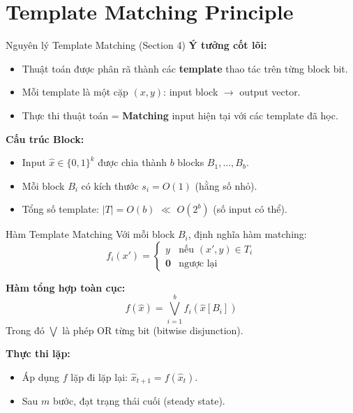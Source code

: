 \section{Template Matching Principle}

\begin{frame}{Nguyên lý Template Matching (Section 4)}
  \textbf{Ý tưởng cốt lõi:}
  \begin{itemize}
    \item Thuật toán được phân rã thành các \textbf{template} thao tác trên từng block bit.
    \item Mỗi template là một cặp $(x, y)$: input block $\to$ output vector.
    \item Thực thi thuật toán = \textbf{Matching} input hiện tại với các template đã học.
  \end{itemize}

  \vspace{0.3cm}
  \textbf{Cấu trúc Block:}
  \begin{itemize}
    \item Input $\hat{x} \in \{0,1\}^k$ được chia thành $b$ blocks $B_1, \ldots, B_b$.
    \item Mỗi block $B_i$ có kích thước $s_i = O(1)$ (hằng số nhỏ).
    \item Tổng số template: $|T| = O(b)$ $\ll$ $O(2^b)$ (số input có thể).
  \end{itemize}
\end{frame}

\begin{frame}{Hàm Template Matching}
  Với mỗi block $B_i$, định nghĩa hàm matching:
  \[
    f_i(x') = \begin{cases}
      y & \text{nếu } (x', y) \in T_i \\
      \mathbf{0} & \text{ngược lại}
    \end{cases}
  \]

  \textbf{Hàm tổng hợp toàn cục:}
  \[
    f(\hat{x}) = \bigvee_{i=1}^{b} f_i(\hat{x}[B_i])
  \]
  Trong đó $\bigvee$ là phép OR từng bit (bitwise disjunction).

  \vspace{0.3cm}
  \textbf{Thực thi lặp:}
  \begin{itemize}
    \item Áp dụng $f$ lặp đi lặp lại: $\hat{x}_{t+1} = f(\hat{x}_t)$.
    \item Sau $m$ bước, đạt trạng thái cuối (steady state).
  \end{itemize}
\end{frame}

